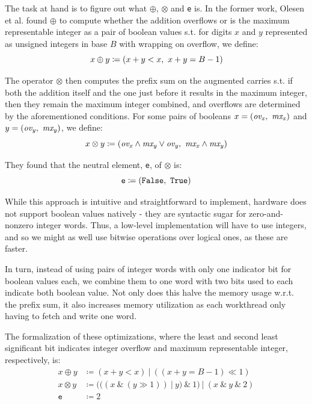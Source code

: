 The task at hand is to figure out what $\oplus$, $\otimes$ and \texttt{e} is. In the former
work, Olesen et al. found $\oplus$ to compute whether the addition overflows or is
the maximum representable integer as a pair of boolean values s.t. for digits
$x$ and $y$ represented as unsigned integers in base $B$ with wrapping on
overflow, we define:
\begin{equation}
\label{eq:oplus}
x \oplus y \coloneq (x + y < x,~x + y = B-1)
\end{equation}

The operator $\otimes$ then computes the prefix sum on the augmented carries s.t. if
both the addition itself and the one just before it results in the maximum
integer, then they remain the maximum integer combined, and overflows are
determined by the aforementioned conditions. For some pairs of booleans
$x = (\mathit{ov_x},~\mathit{mx_{x}})$ and
$y = (\mathit{ov_y},~\mathit{mx_{y}})$, we define:
\begin{equation}
  \label{eq:otimes}
  x \otimes y \coloneq (\mathit{ov_x} \land \mathit{mx_y} \lor \mathit{ov_y},~\mathit{mx_x} \land \mathit{mx_y})
\end{equation}

They found that the neutral element, \texttt{e}, of $\otimes$ is:
\begin{equation}
  \label{eq:otimesne}
  \mathtt{e} \coloneq (\mathtt{False},~\mathtt{True})
\end{equation}

While this approach is intuitive and straightforward to implement, hardware does
not support boolean values natively - they are syntactic sugar for
zero-and-nonzero integer words. Thus, a low-level implementation will have to
use integers, and so we might as well use bitwise operations over logical ones, as
these are faster.

In turn, instead of using pairs of integer words with only one indicator bit for
boolean values each, we combine them to one word with two bits used to each
indicate both boolean value. Not only does this halve the memory usage
w.r.t. the prefix sum, it also increases memory utilization as each workthread
only having to fetch and write one word.

The formalization of these optimizations, where the least and second least
significant bit indicates integer overflow and maximum representable integer,
respectively, is:
\begin{align}
  \label{eq:oplusopt}
  x \oplus y &\coloneq (x + y < x)~|~((x + y = B-1) \ll 1) \\
  \label{eq:otimesopt}
  x \otimes y &\coloneq (((x~\&~(y \gg 1))~|~y)~\&~1)~|~(x~\&~y~\&~2)\\
  \label{eq:otimesneopt}
  \mathtt{e} &\coloneq 2
\end{align}

